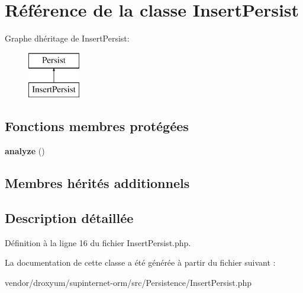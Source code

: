 \hypertarget{class_o_r_m_1_1_persistence_1_1_insert_persist}{}\section{Référence de la classe Insert\+Persist}
\label{class_o_r_m_1_1_persistence_1_1_insert_persist}
Graphe d\textquotesingle{}héritage de Insert\+Persist\+:\begin{figure}[H]
\begin{center}
\leavevmode
\includegraphics[height=2.000000cm]{class_o_r_m_1_1_persistence_1_1_insert_persist}
\end{center}
\end{figure}
\subsection*{Fonctions membres protégées}
\begin{DoxyCompactItemize}
\item 
{\bfseries analyze} ()\hypertarget{class_o_r_m_1_1_persistence_1_1_insert_persist_a9290b43f1b62e53c93e5a72c2cc8413f}{}\label{class_o_r_m_1_1_persistence_1_1_insert_persist_a9290b43f1b62e53c93e5a72c2cc8413f}

\end{DoxyCompactItemize}
\subsection*{Membres hérités additionnels}


\subsection{Description détaillée}


Définition à la ligne 16 du fichier Insert\+Persist.\+php.



La documentation de cette classe a été générée à partir du fichier suivant \+:\begin{DoxyCompactItemize}
\item 
vendor/droxyum/supinternet-\/orm/src/\+Persistence/Insert\+Persist.\+php\end{DoxyCompactItemize}
